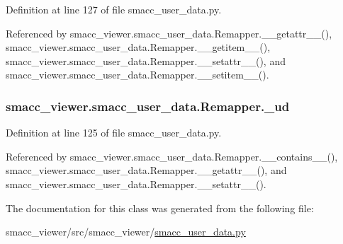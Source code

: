 Definition at line 127 of file smacc\+\_\+user\+\_\+data.\+py.



Referenced by smacc\+\_\+viewer.\+smacc\+\_\+user\+\_\+data.\+Remapper.\+\_\+\+\_\+getattr\+\_\+\+\_\+(), smacc\+\_\+viewer.\+smacc\+\_\+user\+\_\+data.\+Remapper.\+\_\+\+\_\+getitem\+\_\+\+\_\+(), smacc\+\_\+viewer.\+smacc\+\_\+user\+\_\+data.\+Remapper.\+\_\+\+\_\+setattr\+\_\+\+\_\+(), and smacc\+\_\+viewer.\+smacc\+\_\+user\+\_\+data.\+Remapper.\+\_\+\+\_\+setitem\+\_\+\+\_\+().

\subsubsection[{\texorpdfstring{\+\_\+ud}{_ud}}]{\setlength{\rightskip}{0pt plus 5cm}smacc\+\_\+viewer.\+smacc\+\_\+user\+\_\+data.\+Remapper.\+\_\+ud\hspace{0.3cm}{\ttfamily [private]}}\hypertarget{classsmacc__viewer_1_1smacc__user__data_1_1Remapper_a4ad9be52ca6ca7ebf730bac5b0e14c9a}{}\label{classsmacc__viewer_1_1smacc__user__data_1_1Remapper_a4ad9be52ca6ca7ebf730bac5b0e14c9a}


Definition at line 125 of file smacc\+\_\+user\+\_\+data.\+py.



Referenced by smacc\+\_\+viewer.\+smacc\+\_\+user\+\_\+data.\+Remapper.\+\_\+\+\_\+contains\+\_\+\+\_\+(), smacc\+\_\+viewer.\+smacc\+\_\+user\+\_\+data.\+Remapper.\+\_\+\+\_\+getattr\+\_\+\+\_\+(), and smacc\+\_\+viewer.\+smacc\+\_\+user\+\_\+data.\+Remapper.\+\_\+\+\_\+setattr\+\_\+\+\_\+().



The documentation for this class was generated from the following file\+:\begin{DoxyCompactItemize}
\item 
smacc\+\_\+viewer/src/smacc\+\_\+viewer/\hyperlink{smacc__user__data_8py}{smacc\+\_\+user\+\_\+data.\+py}\end{DoxyCompactItemize}
